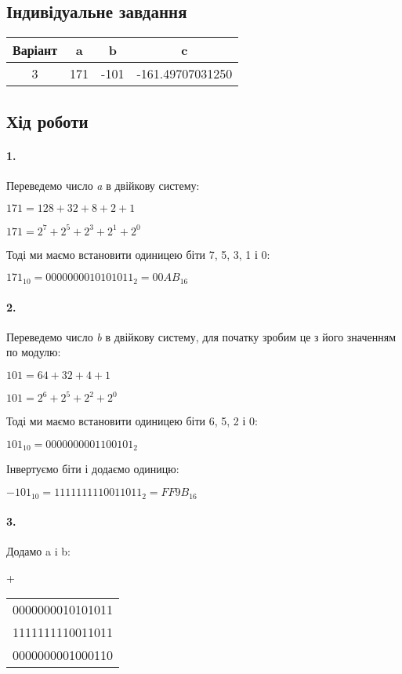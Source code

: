 \documentclass[12pt]{extarticle}
\begin{document}
\vspace{12pt}

\subsection*{Індивідуальне завдання}

\begin{center}
    \begin{tabular}{| c | c | c | c |}
    \hline
    Варіант & a & b & c\\
    \hline
    3 & 171 & -101 & -161.49707031250\\
    \hline
    \end{tabular}
\end{center}

\subsection*{Хід роботи}
\paragraph{1.}
Переведемо число \textit{a} в двійкову систему:

$171 = 128 + 32 + 8 + 2 + 1$

$171 = 2^7 + 2^5 + 2^3 + 2^1 + 2^0$
\vspace*{12pt}

Тоді ми маємо встановити одиницею біти 7, 5, 3, 1 і 0:

$171_{10} = 0000000010101011_2 = 00AB_{16}$

\paragraph{2.}
Переведемо число \textit{b} 
в двійкову систему, для початку зробим це з його значенням по модулю:

$101 = 64 + 32 + 4 + 1$

$101 = 2^6 + 2^5 + 2^2 + 2^0$
\vspace*{12pt}

Тоді ми маємо встановити одиницею біти 6, 5, 2 і 0:

 $101_{10} = 0000000001100101_2$

\vspace*{12pt}
Інвертуємо біти і додаємо одиницю:

$-101_{10} = 1111111110011011_2 = FF9B_{16}$


\paragraph{3.}
Додамо a i b:
\begin{center}
    +
    \begin{tabular}{ c }
    0000000010101011\\
    1111111110011011\\
    \hline
    0000000001000110\\
    \end{tabular}
\end{center}
\end{document}
